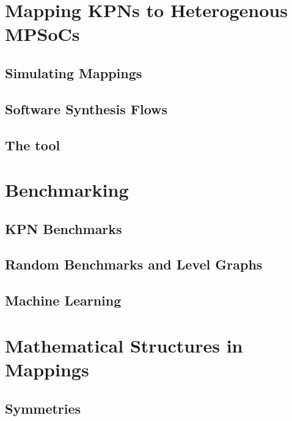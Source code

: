 \documentclass[
		twoside,openright,titlepage,numbers=noenddot,headinclude,%
	 	footinclude=true,cleardoublepage=empty,
		dottedtoc, %
		BCOR=5mm,paper=a4,fontsize=10pt, %
		ngerman,american, %
		]{scrreprt}
\begin{document}
%
\chapter{Mapping \acsp{KPN} to Heterogenous \acsp{MPSoC}}
\label{chap:mapping}


\section{Simulating Mappings}
\label{sec:simulating_mappings}

\section{Software Synthesis Flows}

\section{The \mocasin tool}
\label{sec:mocasin}


\chapter{Benchmarking}
\label{chap:benchmarking}

\section{KPN Benchmarks}
\label{sec:kpn_benchmarks}

\section{Random Benchmarks and Level Graphs}
\label{sec:level_graphs}
\section{Machine Learning}
\label{sec:machine_learning}


\chapter{Mathematical Structures in Mappings}
\label{chap:mapping_structures}

\section{Symmetries}
\label{sec:symmetries}
\end{document}
